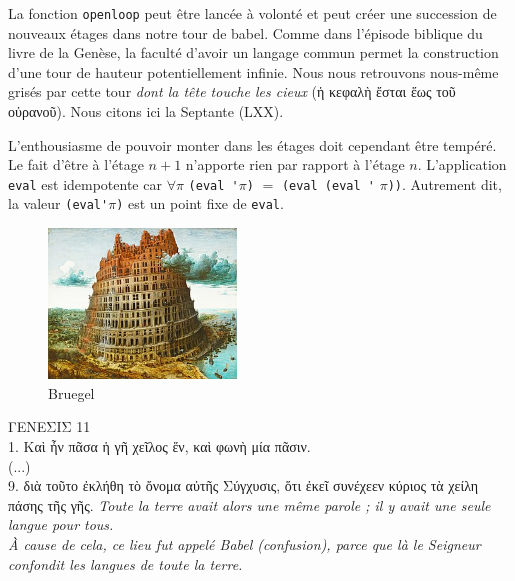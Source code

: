 \documentclass[11pt]{book}
\begin{document}
\begin{minipage}{10.5cm}
  La fonction \verb+openloop+ peut être lancée à volonté et peut créer une succession 
  de  nouveaux étages dans notre tour de babel.
  Comme dans l'épisode biblique du livre de la Genèse\cite{genese}, 
  la faculté d'avoir un langage commun permet la construction
  d'une tour de hauteur potentiellement infinie.
   Nous nous retrouvons nous-même grisés par cette tour \textit{dont la tête touche les cieux}
  (\textgreek{ἡ κεφαλὴ ἔσται ἕως τοῦ οὐρανοῦ}). Nous citons ici la Septante (LXX).
  
  L'enthousiasme de pouvoir
  monter dans les étages doit cependant être tempéré. Le fait d'être à l'étage 
  $n+1$ n'apporte rien par rapport à l'étage $n$. L'application \verb+eval+ est idempotente car 
  $\forall \pi$ \verb+(eval '+$\pi$\verb+)+ $=$ \verb+(eval (eval '+ $\pi$\verb+))+.
  Autrement dit, la valeur \verb+(eval'+$\pi$\verb+)+ est un point fixe de \verb+eval+.
 

  \end{minipage}
  \hfill
  \begin{minipage}{5cm}
    \begin{figure}[H]
      \includegraphics[width=5.0cm]{bruegel.jpg}
      \caption{Bruegel}
      \centering
    \end{figure}
    
\end{minipage}

\vspace{0.5cm}

\textgreek{ΓΕΝΕΣΙΣ     11 \\
  1. Καὶ ἦν πᾶσα ἡ γῆ χεῖλος ἕν, καὶ φωνὴ μία πᾶσιν. \\
   (...) \\ 
  9. διὰ τοῦτο ἐκλήθη τὸ ὄνομα αὐτῆς Σύγχυσις, ὅτι ἐκεῖ συνέχεεν κύριος τὰ χείλη πάσης τῆς γῆς.
}
\textit{\noindent
  Toute la terre avait alors une même parole ; il y avait une seule langue pour tous. \\ 
  À cause de cela, ce lieu fut appelé Babel (confusion), parce que là le Seigneur confondit les langues de toute la terre.
}
\end{document}
